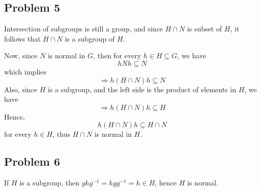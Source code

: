\documentclass{book}
\begin{document}
\subsection*{Problem 5}
Intersection of subgroups is still a group, and since $H \cap N$ is subset of $H$, it follows that $H \cap N$ is a subgroup of $H$.

Now, since $N$ is normal in $G$, then for every $h \in H \subseteq G$, we have
$$hNh \subseteq N$$
which implies
$$\Rightarrow h(H \cap N)h \subseteq N$$
Also, since $H$ is a subgroup, and the left side is the product of elements in $H$, we have
$$\Rightarrow h(H \cap N)h \subseteq H$$
Hence,
$$h(H \cap N)h \subseteq H \cap N$$
for every $h \in H$, thus $H \cap N$ is normal in $H$.

\subsection*{Problem 6}
If $H$ is a subgroup, then $ghg^{-1} = hgg^{-1} = h \in H$, hence $H$ is normal.
\end{document}
